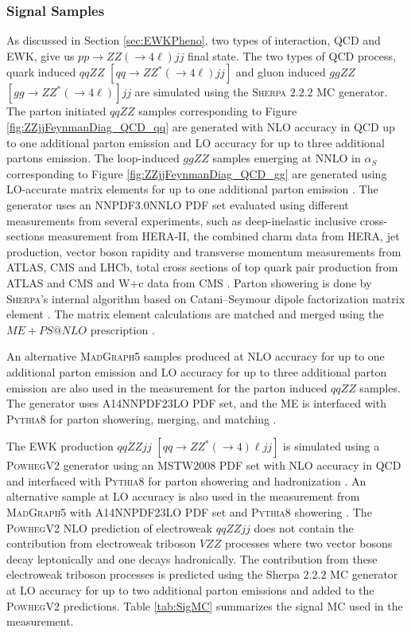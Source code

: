 \subsubsection{Signal Samples}
\label{subsubsec:SigSamples}
As discussed in Section \ref{sec:EWKPheno}, two types of interaction, QCD and EWK, give us $pp \rightarrow ZZ(\rightarrow 4 \ell) jj$ final state. The two types of QCD process, quark induced $qqZZ$ $[qq \rightarrow ZZ^*(\rightarrow 4 \ell) jj]$ and gluon induced $ggZZ$ $[gg \rightarrow ZZ^* (\rightarrow 4\ell) ]jj$ are simulated using the \textsc{Sherpa} $2.2.2$ MC generator. The parton initiated $qqZZ$ samples corresponding to Figure \ref{fig:ZZjjFeynmanDiag_QCD_qq} are generated with NLO accuracy in QCD up to one additional parton emission and LO accuracy for up to three additional partons emission. The loop-induced $ggZZ$ samples emerging at NNLO in $\alpha_{S}$ corresponding to Figure \ref{fig:ZZjjFeynmanDiag_QCD_gg} are generated using LO-accurate matrix elements for up to one additional parton emission \cite{EventGenWithSherpa}. The generator uses an NNPDF3.0NNLO PDF set evaluated using different measurements from several experiments, such as deep-inelastic inclusive cross-sections measurement from HERA-II, the combined charm data from HERA, jet production, vector boson rapidity and transverse momentum measurements from ATLAS, CMS and LHCb, total cross sections of top quark pair production from ATLAS and CMS and W+c data from CMS \cite{PDFForRunII}. Parton showering is done by \textsc{Sherpa}'s internal algorithm based on Catani–Seymour dipole factorization matrix element \cite{SherpaPS}. The matrix element calculations are matched and merged using the $ME+PS@NLO$ prescription \cite{PSMatching}. 

An alternative \textsc{MadGraph5} samples produced at NLO accuracy for up to one additional parton emission and LO accuracy for up to three additional parton emission \cite{MADGRAPHNLO} are also used in the measurement for the parton induced $qqZZ$ samples. The generator uses A14NNPDF23LO PDF set, and the ME is interfaced with \textsc{Pythia8} for parton showering, merging, and matching \cite{Pythia8}. 

The EWK production $qqZZjj$ $[qq \rightarrow ZZ^{*}(\rightarrow 4) \ell jj]$ is simulated using a \textsc{PowhegV2} generator using an MSTW2008 PDF set with NLO accuracy in QCD and interfaced with \textsc{Pythia8} for parton showering and hadronization \cite{PowhegV2}. An alternative sample at LO accuracy is also used in the measurement from \textsc{MadGraph5} with A14NNPDF23LO PDF set and \textsc{Pythia8} showering \cite{MADGRAPHNLO}. The \textsc{PowhegV2} NLO prediction of electroweak $qqZZjj$ does not contain the contribution from electroweak triboson $VZZ$ processes where two vector bosons decay leptonically and one decays hadronically. The contribution from these electroweak triboson processes is predicted using the {Sherpa} $2.2.2$ MC generator at LO accuracy for up to two additional parton emissions and added to the \textsc{PowhegV2} predictions. Table \ref{tab:SigMC} summarizes the signal MC used in the measurement. 

